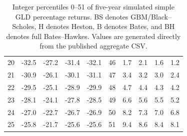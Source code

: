\documentclass[a4paper,10pt,titlepage,oneside,openany]{book}
\theoremstyle{plain}
\theoremstyle{definition}
\theoremstyle{remark}
\begin{document}
\begin{table}[p]
\begin{tabular}{@{}rrrrr@{\hspace{8mm}}rrrrr@{}}
20 & -32.5 & -27.2 & -31.4 & -32.1 & 46 & 1.7 & 2.1 & 1.6 & 1.2 \\
21 & -30.9 & -26.1 & -30.1 & -31.1 & 47 & 3.4 & 3.2 & 3.0 & 2.4 \\
22 & -29.5 & -25.1 & -28.9 & -29.9 & 48 & 4.7 & 4.4 & 4.3 & 4.2 \\
23 & -28.1 & -24.1 & -27.8 & -28.5 & 49 & 6.6 & 5.6 & 5.5 & 5.2 \\
24 & -27.0 & -22.7 & -26.7 & -26.9 & 50 & 8.2 & 7.3 & 7.0 & 6.8 \\
25 & -25.8 & -21.7 & -25.6 & -25.6 & 51 & 9.4 & 8.6 & 8.4 & 8.1 \\
\bottomrule
\end{tabular}
\caption{Integer percentiles 0--51 of five-year simulated simple GLD percentage returns. BS denotes GBM/Black--Scholes, H denotes Heston, B denotes Bates, and BH denotes full Bates--Hawkes. Values are generated directly from the published aggregate CSV.}
\label{tab:appendix-percentiles-0-51}
\end{table}
\clearpage
\end{document}
